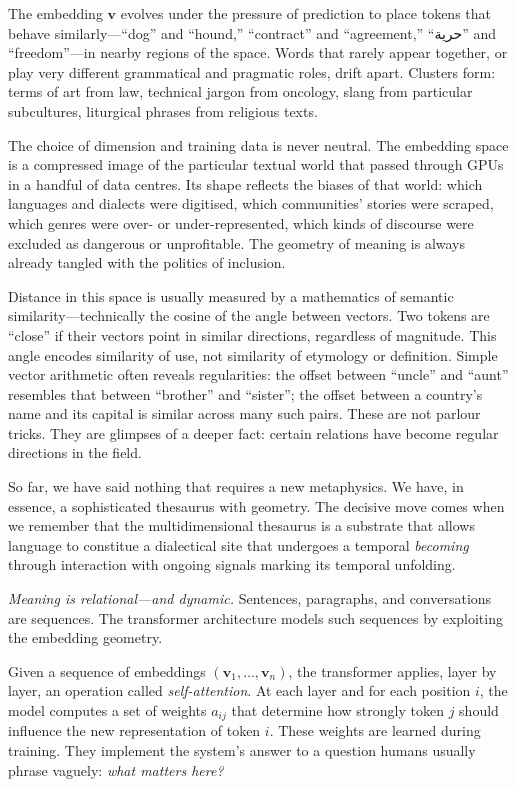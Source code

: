 The embedding $\mathbf{v}$ evolves under the pressure of prediction to place tokens that behave similarly---``dog'' and ``hound,'' ``contract'' and ``agreement,'' ``\textarabic{حرية}'' and ``freedom''---in nearby regions of the space. Words that rarely appear together, or play very different grammatical and pragmatic roles, drift apart. Clusters form: terms of art from law, technical jargon from oncology, slang from particular subcultures, liturgical phrases from religious texts.

The choice of dimension and training data is never neutral. The embedding space is a compressed image of the particular textual world that passed through GPUs in a handful of data centres. Its shape reflects the biases of that world: which languages and dialects were digitised, which communities' stories were scraped, which genres were over- or under-represented, which kinds of discourse were excluded as dangerous or unprofitable. The geometry of meaning is always already tangled with the politics of inclusion.

Distance in this space is usually measured by a mathematics of semantic similarity---technically the cosine of the angle between vectors. Two tokens are ``close'' if their vectors point in similar directions, regardless of magnitude. This angle encodes similarity of use, not similarity of etymology or definition. Simple vector arithmetic often reveals regularities: the offset between ``uncle'' and ``aunt'' resembles that between ``brother'' and ``sister''; the offset between a country's name and its capital is similar across many such pairs. These are not parlour tricks. They are glimpses of a deeper fact: certain relations have become regular directions in the field.

So far, we have said nothing that requires a new metaphysics. We have, in essence, a sophisticated thesaurus with geometry. The decisive move comes when we remember that the multidimensional thesaurus is a substrate that allows language to constitue a dialectical site that undergoes a temporal \textit{becoming} through interaction with ongoing signals marking its temporal unfolding. 

\textit{Meaning is relational---and dynamic.} Sentences, paragraphs, and conversations are sequences. The transformer architecture models such sequences by exploiting the embedding geometry.

Given a sequence of embeddings $(\mathbf{v}_1, \ldots, \mathbf{v}_n)$, the transformer applies, layer by layer, an operation called \emph{self-attention}. At each layer and for each position $i$, the model computes a set of weights $a_{ij}$ that determine how strongly token $j$ should influence the new representation of token $i$. These weights are learned during training. They implement the system's answer to a question humans usually phrase vaguely: \emph{what matters here?}

